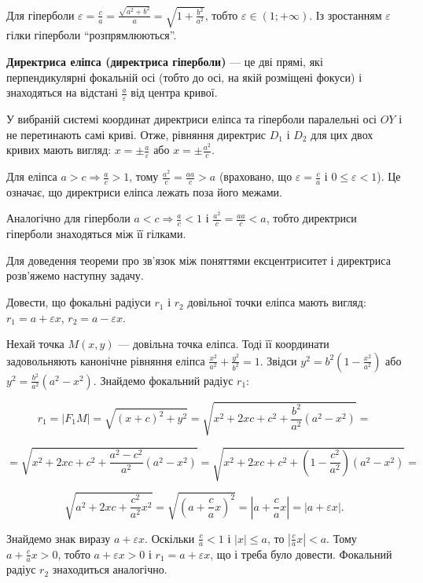 Для гіперболи $\varepsilon = \frac{c}{a} = \frac{\sqrt{a^2 + b^2}}{a} = \sqrt{1+\frac{b^2}{a^2}}$,
тобто $\varepsilon \in (1;+\infty)$. Із зростанням $\varepsilon$ гілки гіперболи “розпрямлюються”.

\begin{definition}
	\textbf{Директриса еліпса (директриса гіперболи)} --- це дві прямі, які
	перпендикулярні фокальній осі (тобто до осі, на якій розміщені фокуси) і
	знаходяться на відстані $\frac{a}{\varepsilon}$ від центра кривої.
\end{definition}

У вибраній системі координат директриси еліпса та гіперболи паралельні осі
$OY$ і не перетинають самі криві. Отже, рівняння директрис $D_1$ і $D_2$ для цих двох
кривих мають вигляд: $x = \pm\frac{a}{\varepsilon}$ або $x = \pm\frac{a^2}{c}$.

Для еліпса $a > c \Rightarrow \frac{a}{c} > 1$, тому $\frac{a^2}{c} = \frac{aa}{c} > a$
(враховано, що $\varepsilon = \frac{c}{a}$ і $0 \leqslant \varepsilon < 1$). Це
означає, що директриси еліпса лежать поза його межами.

Аналогічно для гіперболи $a < c \Rightarrow \frac{a}{c} < 1$ і $\frac{a^2}{c} = \frac{aa}{c} < a$,
тобто директриси гіперболи знаходяться між її гілками.

Для доведення теореми про зв’язок між поняттями ексцентриситет і
директриса розв’яжемо наступну задачу.

\begin{problem}
	Довести, що фокальні радіуси $r_1$ і $r_2$ довільної точки еліпса мають
	вигляд: $r_1 = a + \varepsilon x$, $r_2 = a - \varepsilon x$. 
\end{problem}
\begin{solution}
	Нехай точка $M(x,y)$ --- довільна точка еліпса. Тоді її координати
	задовольняють канонічне рівняння еліпса $\frac{x^2}{a^2} + \frac{y^2}{b^2} = 1$. Звідси $y^2 = b^2(1-\frac{x^2}{a^2})$
	або $y^2 = \frac{b^2}{a^2}(a^2-x^2)$. Знайдемо фокальний радіус $r_1$:

	$$r_1 = |F_1M| = \sqrt{(x+c)^2 + y^2} = \sqrt{x^2 + 2xc + c^2 + \frac{b^2}{a^2}(a^2-x^2)} =$$

	$$= \sqrt{x^2 + 2xc + c^2 + \frac{a^2-c^2}{a^2}(a^2-x^2)} = \sqrt{x^2 + 2xc + c^2 + (1-\frac{c^2}{a^2})(a^2-x^2)} =$$

	$$\sqrt{a^2 + 2xc + \frac{c^2}{a^2}x^2} = \sqrt{(a + \frac{c}{a}x)^2} = |a + \frac{c}{a}x| = |a + \varepsilon x|.$$

	Знайдемо знак виразу $a + \varepsilon x$. Оскільки $\frac{c}{a} < 1$ і $|x| \leqslant a$, то $|\frac{c}{a}x| < a$.
	Тому $a + \frac{c}{a}x > 0$, тобто $a + \varepsilon x > 0$ і $r_1 = a + \varepsilon x$, що і треба було довести. Фокальний
	радіус $r_2$ знаходиться аналогічно.
\end{solution}

